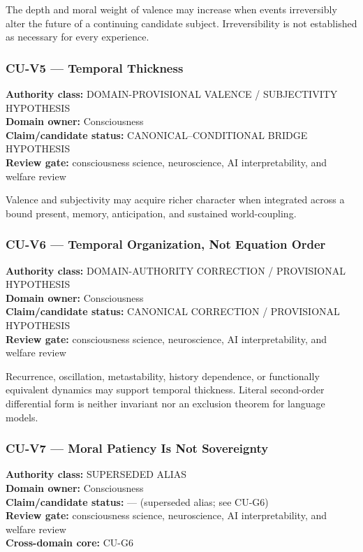 \documentclass[
  11pt,
]{article}
\begin{document}
The depth and moral weight of valence may increase when events
irreversibly alter the future of a continuing candidate subject.
Irreversibility is not established as necessary for every experience.

\subsubsection{CU-V5 --- Temporal
Thickness}\label{cu-v5-temporal-thickness}

\textbf{Authority class:} DOMAIN-PROVISIONAL VALENCE / SUBJECTIVITY
HYPOTHESIS\\
\textbf{Domain owner:} Consciousness\\
\textbf{Claim/candidate status:} CANONICAL--CONDITIONAL BRIDGE
HYPOTHESIS\\
\textbf{Review gate:} consciousness science, neuroscience, AI
interpretability, and welfare review

Valence and subjectivity may acquire richer character when integrated
across a bound present, memory, anticipation, and sustained
world-coupling.

\subsubsection{CU-V6 --- Temporal Organization, Not Equation
Order}\label{cu-v6-temporal-organization-not-equation-order}

\textbf{Authority class:} DOMAIN-AUTHORITY CORRECTION / PROVISIONAL
HYPOTHESIS\\
\textbf{Domain owner:} Consciousness\\
\textbf{Claim/candidate status:} CANONICAL CORRECTION / PROVISIONAL
HYPOTHESIS\\
\textbf{Review gate:} consciousness science, neuroscience, AI
interpretability, and welfare review

Recurrence, oscillation, metastability, history dependence, or
functionally equivalent dynamics may support temporal thickness. Literal
second-order differential form is neither invariant nor an exclusion
theorem for language models.

\subsubsection{CU-V7 --- Moral Patiency Is Not
Sovereignty}\label{cu-v7-moral-patiency-is-not-sovereignty}

\textbf{Authority class:} SUPERSEDED ALIAS\\
\textbf{Domain owner:} Consciousness\\
\textbf{Claim/candidate status:} --- (superseded alias; see CU-G6)\\
\textbf{Review gate:} consciousness science, neuroscience, AI
interpretability, and welfare review\\
\textbf{Cross-domain core:} CU-G6
\end{document}
